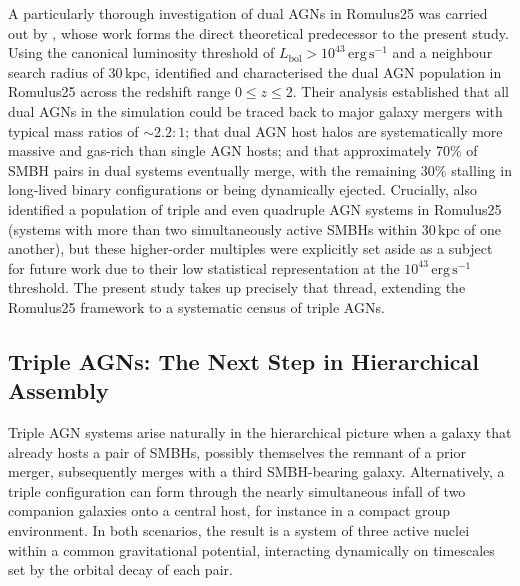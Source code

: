 \documentclass[twocolumn, 10pt]{article}
\begin{document}
A particularly thorough investigation of dual AGNs in Romulus25 was carried out by \citet{Saeedzadeh2024}, whose work forms the direct theoretical predecessor to the present study. Using the canonical luminosity threshold of $L_\mathrm{bol} > 10^{43}\,\mathrm{erg\,s^{-1}}$ and a neighbour search radius of $30\,\mathrm{kpc}$, \citeauthor{Saeedzadeh2024} identified and characterised the dual AGN population in Romulus25 across the redshift range $0 \leq z \leq 2$. Their analysis established that all dual AGNs in the simulation could be traced back to major galaxy mergers with typical mass ratios of $\sim 2.2:1$; that dual AGN host halos are systematically more massive and gas-rich than single AGN hosts; and that approximately 70\% of SMBH pairs in dual systems eventually merge, with the remaining 30\% stalling in long-lived binary configurations or being dynamically ejected. Crucially, \citeauthor{Saeedzadeh2024} also identified a population of triple and even quadruple AGN systems in Romulus25 (systems with more than two simultaneously active SMBHs within $30\,\mathrm{kpc}$ of one another), but these higher-order multiples were explicitly set aside as a subject for future work due to their low statistical representation at the $10^{43}\,\mathrm{erg\,s^{-1}}$ threshold. The present study takes up precisely that thread, extending the Romulus25 framework to a systematic census of triple AGNs.
 
\subsection{Triple AGNs: The Next Step in Hierarchical Assembly}
\label{subsec:triple_theory}
 
Triple AGN systems arise naturally in the hierarchical picture when a galaxy that already hosts a pair of SMBHs, possibly themselves the remnant of a prior merger, subsequently merges with a third SMBH-bearing galaxy. Alternatively, a triple configuration can form through the nearly simultaneous infall of two companion galaxies onto a central host, for instance in a compact group environment. In both scenarios, the result is a system of three active nuclei within a common gravitational potential, interacting dynamically on timescales set by the orbital decay of each pair.
 
\end{document}
